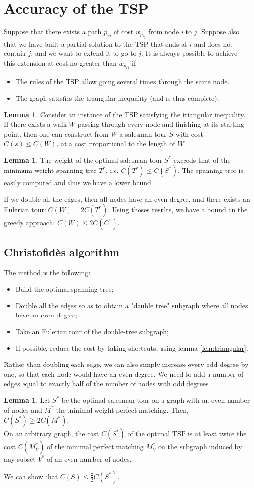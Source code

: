 \documentclass[11pt, openany]{report}
\theoremstyle{definition}
\newtheorem{lem}[thm]{Lemma}
\begin{document}
\section{Accuracy of the TSP}
Suppose that there exists a path $p_{ij}$ of cost $w_{p_{ij}}$ from node $i$ to $j$. Suppose also that we have built a partial solution to the TSP that ends at $i$ and does not contain $j$, and we want to extend it to go to $j$. It is always possible to achieve this extension at cost no greater than $w_{p_{ij}}$ if 
\begin{itemize}
    \item The rules of the TSP allow going several times through the same node.
    \item The graph satisfies the triangular inequality (and is thus complete).
\end{itemize}
\begin{lem}\label{lem:triangular}
    Consider an instance of the TSP satisfying the triangular inequality. If there exists a walk $W$ passing through every node and finishing at its starting point, then one can construct from $W$ a salesman tour $S$ with cost $C(s)\le C(W)$, at a cost proportional to the length of $W$.
\end{lem}
\begin{lem}
    The weight of the optimal salesman tour $S^*$ exceeds that of the minimum weight spanning tree $T^*$, i.e. $C(T^*) \le C(S^*)$. The spanning tree is easily computed and thus we have a lower bound. 
\end{lem}
If we double all the edges, then all nodes have an even degree, and there exists an Eulerian tour: $C(W) = 2C(T^*)$. Using thoses results, we have a bound on the greedy approach: $C(W) \le 2C(C^*)$. 
\subsection{Christofidès algorithm}
The method is the following:
\begin{itemize}
    \item Build the optimal spanning tree;
    \item Double all the edges so as to obtain a "double tree" subgraph where all nodes have an even degree;
    \item Take an Eulerian tour of the double-tree subgraph;
    \item If possible, reduce the cost by taking shortcuts, using lemma \eqref{lem:triangular}. 
\end{itemize}
Rather than doubling each edge, we can also simply increase every odd degree by one, so that each node would have an even degree. We need to add a number of edges equal to exactly half of the number of nodes with odd degrees. 
\begin{lem}
    Let $S^*$ be the optimal salesman tour on a graph with an even number of nodes and $M^*$ the minimal weight perfect matching. Then, $C(S^*) \ge 2C(M^*)$.\\
    On an arbitrary graph, the cost $C(S^*)$ of the optimal TSP is at least twice the cost $C(M^*_V)$ of the minimal perfect matching $M_V^*$ on the subgraph induced by any subset $V^*$ of an even number of nodes. 
\end{lem}
We can show that $C(S)\le \frac{3}{2}C(S^*)$.
\end{document}
